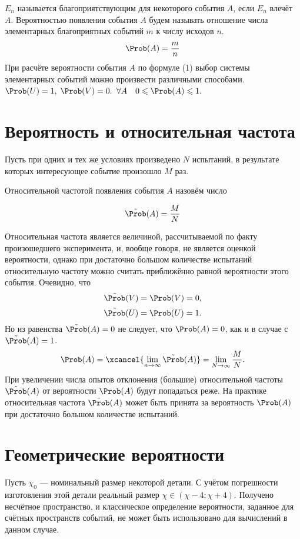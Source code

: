  $E_n$ называется благоприятствующим для некоторого события $A$, если $E_n$ влечёт $A$.
 Вероятностью появления события $A$ будем называть отношение числа элементарных благоприятных событий $m$ к числу исходов $n$.
\begin{equation}
	\Prob (A) = \frac{m}{n} \hfill
\end{equation}
\addition При расчёте вероятности события $A$ по формуле (1) выбор системы элементарных событий можно произвести различными способами.
\conclusion $\Prob(U) = 1, \; \Prob(V) = 0.$
\conclusion $\forall A \quad 0 \leqslant \Prob(A) \leqslant 1.$
\section{Вероятность и относительная частота}
\begin{definition}
	Пусть при одних и тех же условиях произведено $N$ испытаний, в результате которых интересующее событие произошло $M$ раз.
\end{definition}

Относительной частотой появления события $A$ назовём число

\begin{equation}
	\tilde{\Prob}(A) = \frac{M}{N}
\end{equation}

Относительная частота является величиной, рассчитываемой по факту произошедшего эксперимента, и, вообще говоря, не является оценкой вероятности, однако при достаточно большом количестве испытаний относительную частоту можно считать приближённо равной вероятности этого события.
Очевидно, что
$$\tilde{\Prob}(V) = \Prob(V) = 0,$$
$$\tilde{\Prob}(U) = \Prob(U) = 1.$$
Но из равенства $\tilde{\Prob}(A) = 0$ не следует, что $\Prob(A) = 0$, как и в случае с  $\tilde{\Prob}(A) = 1$.
\[
	\Prob(A) = \xcancel {\lim_{n\to\infty} \tilde{\Prob}(A)} = \lim_{N\to\infty} \frac{M}{N}.
\]
При увеличении числа опытов отклонения (большие) относительной частоты $\tilde{\Prob}(A)$ от вероятности $\Prob(A)$ будут попадаться реже. На практике относительная частота $\tilde{\Prob}(A)$ может быть принята за вероятность $\Prob(A)$ при достаточно большом количестве испытаний.

\section{Геометрические вероятности}
Пусть $\chi_0$ --- номинальный размер некоторой детали. С учётом погрешности изготовления этой детали реальный размер $\chi \in (\chi - 4; \chi + 4)$. Получено несчётное пространство, и классическое определение вероятности, заданное для счётных пространств событий, не может быть использовано для вычислений в данном случае.

